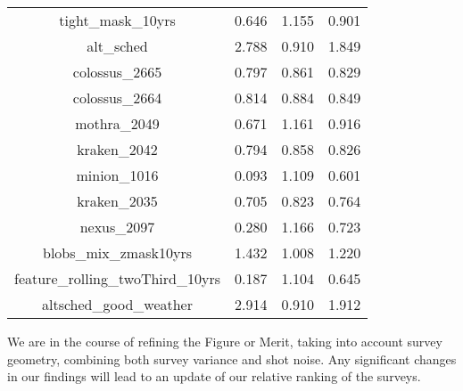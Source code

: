 \begin{table}
\begin{tabular}{|c|rrr|}
tight\_mask\_10yrs  & 0.646 & 1.155 & 0.901  \\
alt\_sched  & 2.788 & 0.910 & 1.849  \\
colossus\_2665  & 0.797 & 0.861 & 0.829  \\
colossus\_2664  & 0.814 & 0.884 & 0.849  \\
mothra\_2049  & 0.671 & 1.161 & 0.916  \\
kraken\_2042  & 0.794 & 0.858 & 0.826  \\
minion\_1016  & 0.093 & 1.109 & 0.601  \\
kraken\_2035  & 0.705 & 0.823 & 0.764  \\
nexus\_2097  & 0.280 & 1.166 & 0.723  \\
blobs\_mix\_zmask10yrs  & 1.432 & 1.008 & 1.220  \\
feature\_rolling\_twoThird\_10yrs  & 0.187 & 1.104 & 0.645  \\
altsched\_good\_weather  & 2.914 & 0.910 & 1.912  \\
\hline
\end{tabular}
\end{table}

We are in the course of refining the Figure or Merit, taking into account survey geometry, combining both survey variance and shot noise.
Any significant changes in our findings will lead to an update of our relative
ranking of the surveys.






